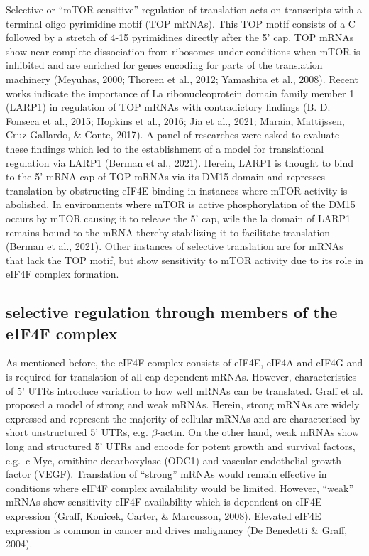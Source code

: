 \documentclass[12pt,openany]{book}
\begin{document}
Selective or ``mTOR sensitive'' regulation of translation acts on
transcripts with a terminal oligo pyrimidine motif (TOP mRNAs). This TOP
motif consists of a C followed by a stretch of 4-15 pyrimidines directly
after the 5' cap. TOP mRNAs show near complete dissociation from
ribosomes under conditions when mTOR is inhibited and are enriched for
genes encoding for parts of the translation machinery (Meyuhas, 2000;
Thoreen et al., 2012; Yamashita et al., 2008). Recent works indicate the
importance of La ribonucleoprotein domain family member 1 (LARP1) in
regulation of TOP mRNAs with contradictory findings (B. D. Fonseca et
al., 2015; Hopkins et al., 2016; Jia et al., 2021; Maraia, Mattijssen,
Cruz-Gallardo, \& Conte, 2017). A panel of researches were asked to
evaluate these findings which led to the establishment of a model for
translational regulation via LARP1 (Berman et al., 2021). Herein, LARP1
is thought to bind to the 5' mRNA cap of TOP mRNAs via its DM15 domain
and represses translation by obstructing eIF4E binding in instances
where mTOR activity is abolished. In environments where mTOR is active
phosphorylation of the DM15 occurs by mTOR causing it to release the 5'
cap, wile the la domain of LARP1 remains bound to the mRNA thereby
stabilizing it to facilitate translation (Berman et al., 2021). Other
instances of selective translation are for mRNAs that lack the TOP
motif, but show sensitivity to mTOR activity due to its role in eIF4F
complex formation.

\subsection{selective regulation through members of the eIF4F complex}

As mentioned before, the eIF4F complex consists of eIF4E, eIF4A and
eIF4G and is required for translation of all cap dependent mRNAs.
However, characteristics of 5' UTRs introduce variation to how well
mRNAs can be translated. Graff et al. proposed a model of strong and
weak mRNAs. Herein, strong mRNAs are widely expressed and represent the
majority of cellular mRNAs and are characterised by short unstructured
5' UTRs, e.g. \(\beta\)-actin. On the other hand, weak mRNAs show long
and structured 5' UTRs and encode for potent growth and survival
factors, e.g.~c-Myc, ornithine decarboxylase (ODC1) and vascular
endothelial growth factor (VEGF). Translation of ``strong'' mRNAs would
remain effective in conditions where eIF4F complex availability would be
limited. However, ``weak'' mRNAs show sensitivity eIF4F availability
which is dependent on eIF4E expression (Graff, Konicek, Carter, \&
Marcusson, 2008). Elevated eIF4E expression is common in cancer and
drives malignancy (De Benedetti \& Graff, 2004).
\end{document}
